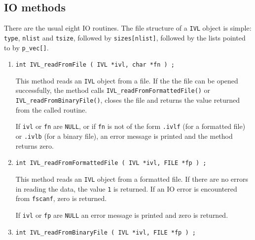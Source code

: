 \subsection{IO methods}
\label{subsection:IVL:proto:IO}
\par
There are the usual eight IO routines.
The file structure of a {\tt IVL} object is simple:
{\tt type},
{\tt nlist} and
{\tt tsize},
followed by {\tt sizes[nlist]},
followed by the lists pointed to by {\tt p\_vec[]}.
\par
\begin{enumerate}
\item
\begin{verbatim}
int IVL_readFromFile ( IVL *ivl, char *fn ) ;
\end{verbatim}
\par
This method reads an {\tt IVL} object from a file.
If the the file can be opened successfully, 
the method calls {\tt IVL\_readFromFormattedFile()} or
{\tt IVL\_readFromBinaryFile()}, 
closes the file
and returns the value returned from the called routine.
\par {}
If {\tt ivl} or {\tt fn} are {\tt NULL}, 
or if {\tt fn} is not of the form
{\tt *.ivlf} (for a formatted file) 
or {\tt *.ivlb} (for a binary file),
an error message is printed and the method returns zero.
\item
\begin{verbatim}
int IVL_readFromFormattedFile ( IVL *ivl, FILE *fp ) ;
\end{verbatim}
\par
This method reads an {\tt IVL} object from a formatted file.
If there are no errors in reading the data, 
the value {\tt 1} is returned.
If an IO error is encountered from {\tt fscanf}, zero is returned.
\par {}
If {\tt ivl} or {\tt fp} are {\tt NULL} 
an error message is printed and zero is returned.
\item
\begin{verbatim}
int IVL_readFromBinaryFile ( IVL *ivl, FILE *fp ) ;
\end{verbatim}

\end{enumerate}
